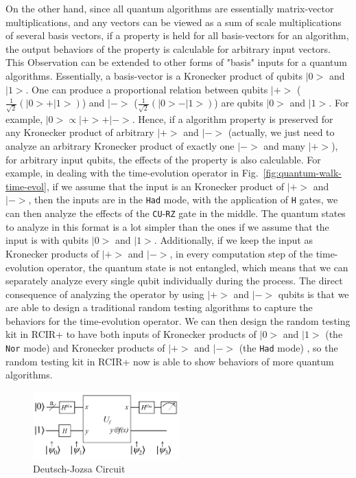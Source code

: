 On the other hand, since all quantum algorithms are essentially matrix-vector multiplications, and any vectors can be viewed as a sum of scale multiplications of several basis vectors, if a property is held for all basis-vectors for an algorithm, the output behaviors of the property is calculable for arbitrary input vectors. 
This Observation can be extended to other forms of "basis" inputs for a quantum algorithms. Essentially, a basis-vector is a Kronecker product of qubits $|0>$ and $|1>$. One can produce a proportional relation between qubits $|+>$ ($\frac{1}{\sqrt{2}}(|0>+|1>)$) and $|->$ ($\frac{1}{\sqrt{2}}(|0>-|1>)$) are qubits $|0>$ and $|1>$. For example, $|0>\propto |+> + |->$. Hence, if a algorithm property is preserved for any Kronecker product of arbitrary $|+>$ and $|->$ (actually, we just need to analyze an arbitrary Kronecker product of exactly one $|->$ and many $|+>$), for arbitrary input qubits, the effects of the property is also calculable. 
For example, in dealing with the time-evolution operator in Fig.~\ref{fig:quantum-walk-time-evol}, if we assume that the input is an Kronecker product of $|+>$ and $|->$, then the inputs are in the \texttt{Had} mode, with the application of \texttt{H} gates, we can then analyze the effects of the \texttt{CU}-\texttt{RZ} gate in the middle. The quantum states to analyze in this format is a lot simpler than the ones if we assume that the input is with qubits $|0>$ and $|1>$. Additionally, if we keep the input as Kronecker products of $|+>$ and $|->$, in every computation step of the time-evolution operator, the quantum state is not entangled, which means that we can separately analyze every single qubit individually during the process. The direct consequence of analyzing the operator by using $|+>$ and $|->$ qubits is that we are able to design a traditional random testing algorithms to capture the behaviors for the time-evolution operator. We can then design the random testing kit in RCIR+ to have both inputs of Kronecker products of $|0>$ and $|1>$ (the \texttt{Nor} mode) and Kronecker products of $|+>$ and $|->$ (the \texttt{Had} mode) , so the random testing kit in RCIR+ now is able to show behaviors of more quantum algorithms. 

\begin{figure}[h]
\centering
         \includegraphics[width=0.5\textwidth]{deutsch-jozsa.png}
\caption{Deutsch-Jozsa Circuit}
\label{fig:Deutsch–Jozsa}
\end{figure}

